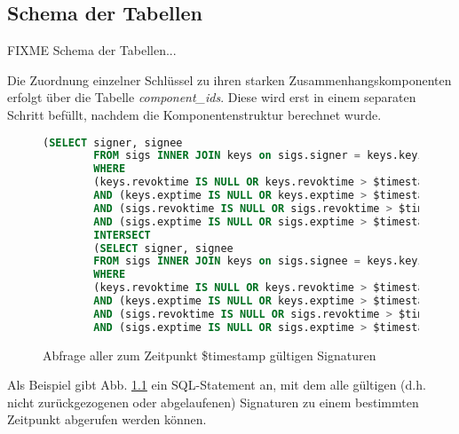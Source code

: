 \begin{appendix}
  \chapter{Schema der Tabellen}
  \label{sec:schema-der-tabellen}

  FIXME Schema der Tabellen...

  Die Zuordnung einzelner Schlüssel zu ihren starken
  Zusammenhangskomponenten erfolgt über die Tabelle
  \emph{component\_ids}. Diese wird erst in einem separaten Schritt
  befüllt, nachdem die Komponentenstruktur berechnet wurde.

  \begin{figure}[h]
    \centering
    {\scriptsize
      \begin{lstlisting}[language=SQL]
        (SELECT signer, signee
        FROM sigs INNER JOIN keys on sigs.signer = keys.keyid 
        WHERE 
        (keys.revoktime IS NULL OR keys.revoktime > $timestamp) 
        AND (keys.exptime IS NULL OR keys.exptime > $timestamp)
        AND (sigs.revoktime IS NULL OR sigs.revoktime > $timestamp) 
        AND (sigs.exptime IS NULL OR sigs.exptime > $timestamp)) 
        INTERSECT 
        (SELECT signer, signee 
        FROM sigs INNER JOIN keys on sigs.signee = keys.keyid
        WHERE 
        (keys.revoktime IS NULL OR keys.revoktime > $timestamp) 
        AND (keys.exptime IS NULL OR keys.exptime > $timestamp) 
        AND (sigs.revoktime IS NULL OR sigs.revoktime > $timestamp) 
        AND (sigs.exptime IS NULL OR sigs.exptime > $timestamp))"
      \end{lstlisting}
    }
    \caption{Abfrage aller zum Zeitpunkt \$timestamp gültigen Signaturen}
    \label{fig:all-valid-keys}
  \end{figure}

  Als Beispiel gibt Abb. \ref{fig:all-valid-keys} ein SQL-Statement an,
  mit dem alle gültigen (d.h. nicht zurückgezogenen oder abgelaufenen)
  Signaturen zu einem bestimmten Zeitpunkt abgerufen werden können.
\end{appendix}
